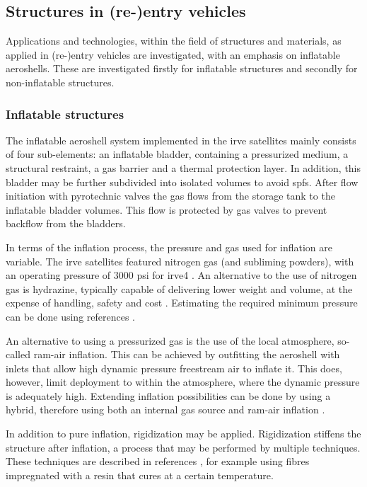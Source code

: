 \subsection{Structures in (re-)entry vehicles}\label{sec:struc}
Applications and technologies, within the field of structures and materials, as applied in (re-)entry vehicles are investigated, with an emphasis on inflatable aeroshells. These are investigated firstly for inflatable structures and secondly for non-inflatable structures.

\subsubsection{Inflatable structures}
The inflatable aeroshell system implemented in the \gls{irve} satellites mainly consists of four sub-elements: an inflatable bladder, containing a pressurized medium, a structural restraint, a gas barrier and a thermal protection layer. In addition, this bladder may be further subdivided into isolated volumes to avoid \gls{spfs}. After flow initiation with pyrotechnic valves the gas flows from the storage tank to the inflatable bladder volumes. This flow is protected by gas valves to prevent backflow from the bladders. \cite{Hughes2005} 

In terms of the inflation process, the pressure and gas used for inflation are variable. The \gls{irve} satellites featured nitrogen gas (and subliming powders), with an operating pressure of 3000 psi for \gls{irve4} \cite{Litton2011}. An alternative to the use of nitrogen gas is hydrazine, typically capable of delivering lower weight and volume, at the expense of handling, safety and cost \cite{Freeland1998}. Estimating the required minimum pressure can be done using references \cite{Samareh2011, Brown2009}.

An alternative to using a pressurized gas is the use of the local atmosphere, so-called ram-air inflation. This can be achieved by outfitting the aeroshell with inlets that allow high dynamic pressure freestream air to inflate it. This does, however, limit deployment to within the atmosphere, where the dynamic pressure is adequately high. Extending inflation possibilities can be done by using a hybrid, therefore using both an internal gas source and ram-air inflation \cite{Smith2010}.

In addition to pure inflation, rigidization may be applied. Rigidization stiffens the structure after inflation, a process that may be performed by multiple techniques. These techniques are described in references \cite{Freeland1998,Jenkins2001}, for example using fibres impregnated with a resin that cures at a certain temperature. 

